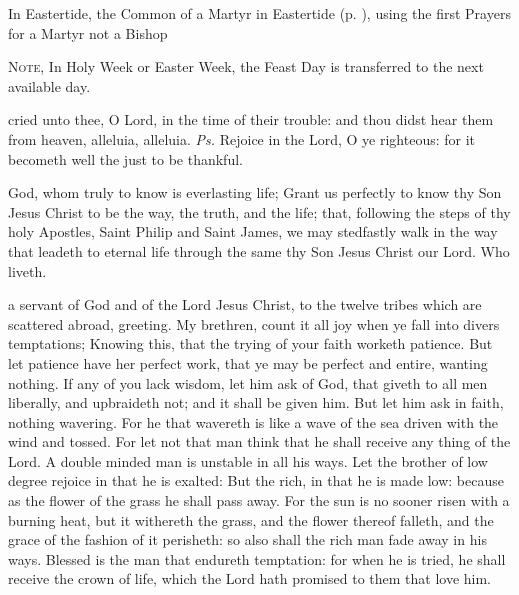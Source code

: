 \begin{rubric}
	In Eastertide, the Common of a Martyr in Eastertide (p. \pageref{CommonMartyrEaster}), using the first Prayers for a Martyr not a Bishop
\end{rubric}


\clearpage
{}

\begin{rubric}
	\textsc{Note,} In Holy Week or Easter Week, the Feast Day is transferred to the next available day.
\end{rubric}

\introit
{} cried unto thee, O Lord, in the time of their trouble: and thou didst hear them from heaven, alleluia, alleluia. \textit{Ps.} Rejoice in the Lord, O ye righteous: for it becometh well the just to be thankful.

\collect
{} God, whom truly to know is everlasting life; Grant us perfectly to know thy Son Jesus Christ to be the way, the truth, and the life; that, following the steps of thy holy Apostles, Saint Philip and Saint James, we may stedfastly walk in the way that leadeth to eternal life through the same thy Son Jesus Christ our Lord. Who liveth.

 a servant of God and of the Lord Jesus Christ, to the twelve tribes which are scattered abroad, greeting. My brethren, count it all joy when ye fall into divers temptations; Knowing this, that the trying of your faith worketh patience. But let patience have her perfect work, that ye may be perfect and entire, wanting nothing. If any of you lack wisdom, let him ask of God, that giveth to all men liberally, and upbraideth not; and it shall be given him. But let him ask in faith, nothing wavering. For he that wavereth is like a wave of the sea driven with the wind and tossed. For let not that man think that he shall receive any thing of the Lord. A double minded man is unstable in all his ways. Let the brother of low degree rejoice in that he is exalted: But the rich, in that he is made low: because as the flower of the grass he shall pass away. For the sun is no sooner risen with a burning heat, but it withereth the grass, and the flower thereof falleth, and the grace of the fashion of it perisheth: so also shall the rich man fade away in his ways. Blessed is the man that endureth temptation: for when he is tried, he shall receive the crown of life, which the Lord hath promised to them that love him.

